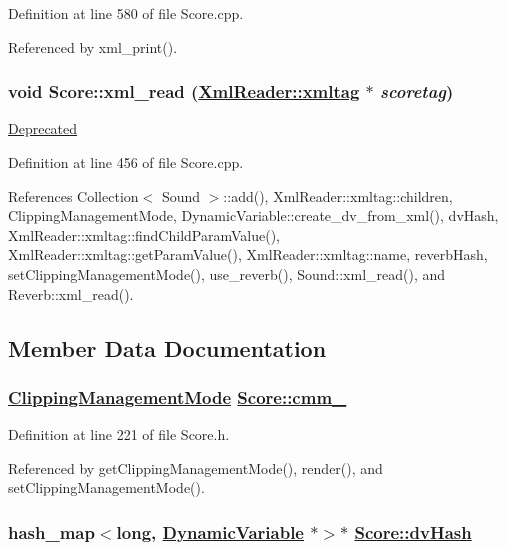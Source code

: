 Definition at line 580 of file Score.cpp.

Referenced by xml\_\-print().\hypertarget{classScore_a9}{
\subsubsection[xml\_\-read]{\setlength{\rightskip}{0pt plus 5cm}void Score::xml\_\-read (\hyperlink{classXmlReader_1_1xmltag}{Xml\-Reader::xmltag} $\ast$ {\em scoretag})}}
\label{classScore_a9}


\begin{Desc}
\item[\hyperlink{deprecated__deprecated000032}{Deprecated}]\end{Desc}


Definition at line 456 of file Score.cpp.

References Collection$<$ Sound $>$::add(), Xml\-Reader::xmltag::children, Clipping\-Management\-Mode, Dynamic\-Variable::create\_\-dv\_\-from\_\-xml(), dv\-Hash, Xml\-Reader::xmltag::find\-Child\-Param\-Value(), Xml\-Reader::xmltag::get\-Param\-Value(), Xml\-Reader::xmltag::name, reverb\-Hash, set\-Clipping\-Management\-Mode(), use\_\-reverb(), Sound::xml\_\-read(), and Reverb::xml\_\-read().

\subsection{Member Data Documentation}
\hypertarget{classScore_r0}{
\subsubsection[cmm\_\-]{\setlength{\rightskip}{0pt plus 5cm}\hyperlink{classScore_w6}{Clipping\-Management\-Mode} \hyperlink{classScore_r0}{Score::cmm\_\-}}}
\label{classScore_r0}




Definition at line 221 of file Score.h.

Referenced by get\-Clipping\-Management\-Mode(), render(), and set\-Clipping\-Management\-Mode().\hypertarget{classScore_o1}{
\subsubsection[dvHash]{\setlength{\rightskip}{0pt plus 5cm}hash\_\-map$<$long, \hyperlink{classDynamicVariable}{Dynamic\-Variable} $\ast$$>$$\ast$ \hyperlink{classScore_o1}{Score::dv\-Hash}}}
\label{classScore_o1}




